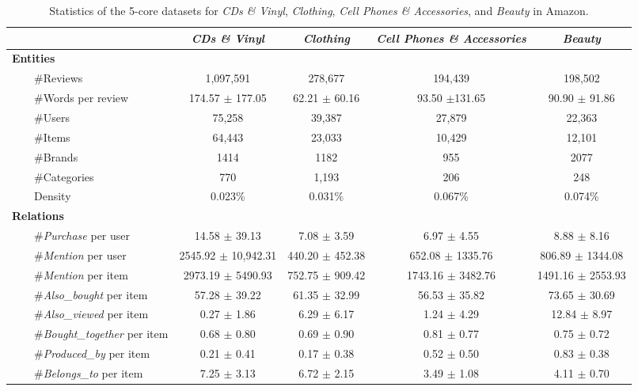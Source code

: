 \documentclass[algorithms,article,accept,moreauthors,pdftex,10pt,a4paper]{Definitions/mdpi}
\begin{document}
\begin{table}[H]
\centering
	\small
	\setlength{\tabcolsep}{2pt}
	\caption{Statistics of the 5-core datasets for \textit{CDs \& Vinyl}, \textit{Clothing}, \textit{Cell Phones \& Accessories}, and \textit{Beauty} in Amazon. 
	}
	\vspace{-5pt}
	\begin{tabular}{ l c  c  c  c   } \toprule
		& \textit{\bf{CDs \& Vinyl}} & \textit{\bf{Clothing}} & \textit{\bf{Cell Phones \& Accessories}} & \textit{\bf{Beauty}}\\
		\midrule
		\textbf{Entities}\\
		~~~~\#Reviews & 1,097,591 & 278,677 & 194,439 & 198,502\\ ~~~~\#Words per review & 174.57 $\pm$ 177.05 & 62.21 $\pm$ 60.16 & 93.50 $\pm  $131.65 & 90.90 $\pm$ 91.86\\
		~~~~\#Users & 75,258 & 39,387 & 27,879 & 22,363 \\ ~~~~\#Items & 64,443 & 23,033 & 10,429 & 12,101\\ ~~~~\#Brands & 1414 & 1182 & 955 & 2077\\ ~~~~\#Categories & 770 & 1,193 & 206 & 248\\ ~~~~Density & 0.023\% & 0.031\% & 0.067\% & 0.074\%\\\midrule
		\textbf{Relations}\\
		~~~~\#\textit{Purchase} per user & 14.58 $\pm$ 39.13 & 7.08 $\pm$ 3.59 & 6.97 $\pm$ 4.55 & 8.88 $\pm$ 8.16\\ ~~~~\#\textit{Mention} per user & 2545.92 $\pm$ 10,942.31 & 440.20 $\pm$ 452.38 & 652.08 $\pm$ 1335.76 & 806.89 $\pm$ 1344.08\\ ~~~~\#\textit{Mention} per item & 2973.19 $\pm$ 5490.93 & 752.75 $\pm$ 909.42 & 1743.16 $\pm$ 3482.76 & 1491.16 $\pm$ 2553.93\\ ~~~~\#\textit{Also\_bought} per item & 57.28 $\pm$ 39.22 & 61.35 $\pm$ 32.99 & 56.53 $\pm$ 35.82 & 73.65 $\pm$ 30.69\\ ~~~~\#\textit{Also\_viewed} per item & 0.27 $\pm$ 1.86 & 6.29 $\pm$ 6.17 & 1.24 $\pm$ 4.29 & 12.84 $\pm$ 8.97\\ ~~~~\#\textit{Bought\_together} per item & 0.68 $\pm$ 0.80 & 0.69 $\pm$ 0.90 & 0.81 $\pm$ 0.77 & 0.75 $\pm$ 0.72\\ ~~~~\#\textit{Produced\_by} per item & 0.21 $\pm$ 0.41 & 0.17 $\pm$ 0.38 & 0.52 $\pm$ 0.50 & 0.83 $\pm$ 0.38\\ ~~~~\#\textit{Belongs\_to} per item & 7.25 $\pm$ 3.13 & 6.72 $\pm$ 2.15 & 3.49 $\pm$ 1.08 & 4.11 $\pm$ 0.70\\ 

\bottomrule
	\end{tabular}
	\vspace{-5pt}
	\label{tab:dataset_statistics}
\end{table}
\end{document}
